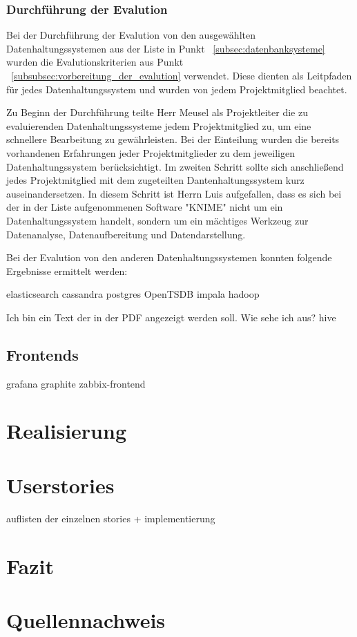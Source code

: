 \subsubsection{Durchführung der Evalution}
\label{subsubsec:durchfuehrung_der_evalution}
Bei der Durchführung der Evalution von den ausgewählten
Datenhaltungssystemen aus der Liste in Punkt ~\ref{subsec:datenbanksysteme}
wurden die Evalutionskriterien aus Punkt 
~\ref{subsubsec:vorbereitung_der_evalution} verwendet. Diese dienten
als Leitpfaden für jedes Datenhaltungssystem und wurden von jedem
Projektmitglied beachtet.

Zu Beginn der Durchführung teilte Herr Meusel als Projektleiter
die zu evaluierenden Datenhaltungssysteme jedem Projektmitglied zu,
um eine schnellere Bearbeitung zu gewährleisten. Bei der Einteilung
wurden die bereits vorhandenen Erfahrungen jeder Projektmitglieder zu
dem jeweiligen Datenhaltungssystem berücksichtigt. Im zweiten Schritt
sollte sich anschließend jedes Projektmitglied mit dem zugeteilten
Dantenhaltungssystem kurz auseinandersetzen. In diesem Schritt ist
Herrn Luis aufgefallen, dass es sich bei der in der Liste
aufgenommenen Software "KNIME" nicht um ein Datenhaltungssystem
handelt, sondern um ein mächtiges Werkzeug zur Datenanalyse,
Datenaufbereitung und Datendarstellung.

Bei der Evalution von den anderen Datenhaltungssystemen konnten
folgende Ergebnisse ermittelt werden: 
\begin{outline}
  \1 elasticsearch
  \1 cassandra
  \1 postgres
  \1 OpenTSDB
  \1 impala
  \1 hadoop
  
  Ich bin ein Text der in der PDF angezeigt werden soll.
  Wie sehe ich aus?
  \1 hive
\end{outline}
\nl%

\subsection{Frontends}

\begin{outline}
  \1 grafana
  \1 graphite
  \1 zabbix-frontend
\end{outline}

\section{Realisierung}

\section{Userstories}
auflisten der einzelnen stories + implementierung

\section{Fazit}

\section{Quellennachweis}
\printbibliography%
